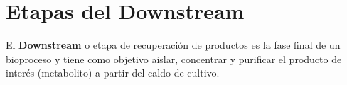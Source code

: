 


\section{Etapas del Downstream}

El \textbf{Downstream} o etapa de recuperación de productos es la fase final de un bioproceso y tiene como objetivo aislar, concentrar y purificar el producto de interés (metabolito) a partir del caldo de cultivo.

